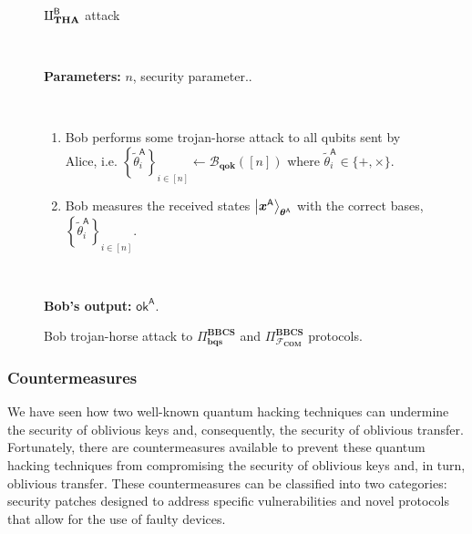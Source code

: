 \begin{figure}[h!]
    \centering
        \begin{tcolorbox}
            
            \centerline{$\rotPi^{\mathsf{B}}_{\textbf{THA}}$ attack}
            
            \
            
            \textbf{Parameters:}  $n$, security parameter..
            
            \
            
            \begin{enumerate}
         \item Bob performs some trojan-horse attack to all qubits sent by Alice, i.e. $\left\{\tilde{\theta}^{\mathsf{A}}_{i}\right\}_{i\in [n]} \leftarrow \mathcal{B}_{\textbf{qok}}([n]) $ where $\tilde{\theta}^{\mathsf{A}}_{i}\in\{+, \times\}$.
         \item Bob measures the received states $\ket{\bm{x}^{\textsf{A}}}_{\bm{\theta}^{\textsf{A}}}$ with the correct bases, $\left\{\tilde{\theta}^{\mathsf{A}}_{i}\right\}_{i\in [n]}$. 
    \end{enumerate}    
            
            \
            
        \textbf{Bob's output:} $\mathsf{ok}^{\mathsf{A}}$.

        
        \end{tcolorbox}
    \caption{Bob trojan-horse attack to $\Pi^{\textbf{BBCS}}_{\textbf{bqs}}$ and $\Pi^{\textbf{BBCS}}_{\mathcal{F}_\textbf{COM}}$ protocols.}
    \label{fig:B_THA}
\end{figure}




\subsubsection{Countermeasures}

We have seen how two well-known quantum hacking techniques can undermine the security of oblivious keys and, consequently, the security of oblivious transfer. Fortunately, there are countermeasures available to prevent these quantum hacking techniques from compromising the security of oblivious keys and, in turn, oblivious transfer. These countermeasures can be classified into two categories: security patches designed to address specific vulnerabilities and novel protocols that allow for the use of faulty devices.

